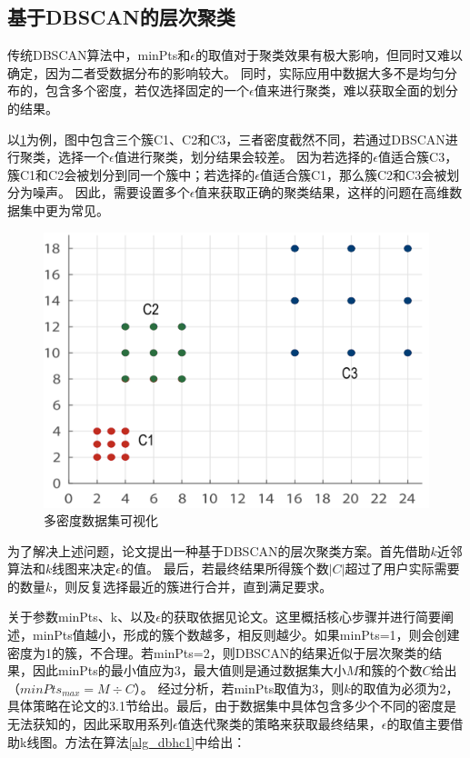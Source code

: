 \subsection{基于DBSCAN的层次聚类}
传统DBSCAN算法中，minPts和$ \epsilon $的取值对于聚类效果有极大影响，但同时又难以确定，因为二者受数据分布的影响较大。
同时，实际应用中数据大多不是均匀分布的，包含多个密度，若仅选择固定的一个$ \epsilon $值来进行聚类，难以获取全面的划分的结果。

以\ref{s4-dbhcexa}为例，图中包含三个簇C1、C2和C3，三者密度截然不同，若通过DBSCAN进行聚类，选择一个$ \epsilon $值进行聚类，划分结果会较差。
因为若选择的$ \epsilon $值适合簇C3，簇C1和C2会被划分到同一个簇中；若选择的$ \epsilon $值适合簇C1，那么簇C2和C3会被划分为噪声。
因此，需要设置多个$ \epsilon $值来获取正确的聚类结果，这样的问题在高维数据集中更为常见。
\begin{figure}[htbp] %
	\centering
	\includegraphics[scale=0.6]{img/dbhcexa.png}
	\caption{多密度数据集可视化}
	\label{s4-dbhcexa}
\end{figure}

为了解决上述问题，论文\cite{latifi2021dbhc}提出一种基于DBSCAN的层次聚类方案。首先借助$ k $近邻算法和$ k $线图来决定$ \epsilon $的值。
最后，若最终结果所得簇个数$ |C| $超过了用户实际需要的数量$ k $，则反复选择最近的簇进行合并，直到满足要求。

关于参数minPts、k、以及$\epsilon$的获取依据见论文\cite{latifi2021dbhc}。这里概括核心步骤并进行简要阐述，minPts值越小，形成的簇个数越多，相反则越少。如果minPts=1，则会创建密度为1的簇，不合理。若minPts=2，则DBSCAN的结果近似于层次聚类的结果，因此minPts的最小值应为3，最大值则是通过数据集大小$ M $和簇的个数$ C $给出（$ minPts_{max} = M\div C $）。
经过分析，若minPts取值为3，则$ k $的取值为必须为2，具体策略在论文\cite{latifi2021dbhc}的3.1节给出。最后，由于数据集中具体包含多少个不同的密度是无法获知的，因此采取用系列$\epsilon$值迭代聚类的策略来获取最终结果，$\epsilon$的取值主要借助k线图。方法在算法\ref{alg_dbhc1}中给出：

